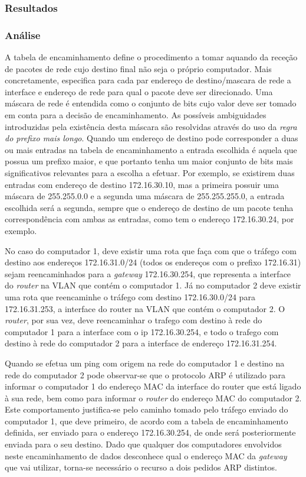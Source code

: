 \documentclass{article}
\begin{document}
\subsubsection{Resultados}

\subsubsection{Análise}
A tabela de encaminhamento define o procedimento a tomar aquando da receção de pacotes de rede cujo destino final não seja o próprio computador. Mais concretamente, especifica para cada par endereço de destino/mascara de rede a interface e endereço de rede para qual o pacote deve ser direcionado. Uma máscara de rede é entendida como o conjunto de bits cujo valor deve ser tomado em conta para a decisão de encaminhamento. As possíveis ambiguidades introduzidas pela existência desta máscara são resolvidas através do uso da \textit{regra do prefixo mais longo}. Quando um endereço de destino pode corresponder a duas ou mais entradas na tabela de encaminhamento a entrada escolhida é aquela que possua um prefixo maior, e que portanto tenha um maior conjunto de bits mais significativos relevantes para a escolha a efetuar. Por exemplo, se existirem duas entradas com endereço de destino 172.16.30.10, mas a primeira possuir uma máscara de 255.255.0.0 e a segunda uma máscara de 255.255.255.0, a entrada escolhida será a segunda, sempre que o endereço de destino de um pacote tenha correspondência com ambas as entradas, como tem o endereço 172.16.30.24, por exemplo.


No caso do computador 1, deve existir uma rota que faça com que o tráfego com destino aos endereços 172.16.31.0/24 (todos os endereços com o prefixo 172.16.31) sejam reencaminhados para a \textit{gateway} 172.16.30.254, que representa a interface do \textit{router} na VLAN que contém o computador 1. Já no computador 2 deve existir uma rota que reencaminhe o tráfego com destino 172.16.30.0/24 para 172.16.31.253, a interface do router na VLAN que contém o computador 2. O \textit{router}, por sua vez, deve reencaminhar o trafego com destino à rede do computador 1 para a interface com o ip 172.16.30.254, e todo o trafego com destino à rede do computador 2 para a interface de endereço 172.16.31.254.

Quando se efetua um ping com origem na rede do computador 1 e destino na rede do computador 2 pode observar-se que o protocolo ARP é utilizado para informar o computador 1 do endereço MAC da interface do router que está ligado à sua rede, bem como para informar o \textit{router} do endereço MAC do computador 2. Este comportamento justifica-se pelo caminho tomado pelo tráfego enviado do computador 1, que deve primeiro, de acordo com a tabela de encaminhamento definida, ser enviado para o endereço 172.16.30.254, de onde será posteriormente enviada para o seu destino. Dado que qualquer dos computadores envolvidos neste encaminhamento de dados desconhece qual o endereço MAC da \textit{gateway} que vai utilizar, torna-se necessário o recurso a dois pedidos ARP distintos.
\end{document}
